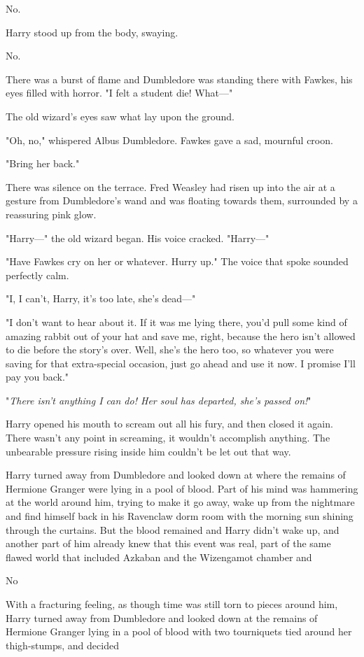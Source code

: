 No.

Harry stood up from the body, swaying.

No.

There was a burst of flame and Dumbledore was standing there with Fawkes, his 
eyes filled with horror. "I felt a student die! What---"

The old wizard's eyes saw what lay upon the ground.

"Oh, no," whispered Albus Dumbledore. Fawkes gave a sad, mournful croon.

"Bring her back."

There was silence on the terrace. Fred Weasley had risen up into the air at a 
gesture from Dumbledore's wand and was floating towards them, surrounded by a 
reassuring pink glow.

"Harry---" the old wizard began. His voice cracked. "Harry---"

"Have Fawkes cry on her or whatever. Hurry up." The voice that spoke sounded 
perfectly calm.

"I, I can't, Harry, it's too late, she's dead---"

"I don't want to hear about it. If it was me lying there, you'd pull some kind 
of amazing rabbit out of your hat and save me, right, because the hero isn't 
allowed to die before the story's over. Well, she's the hero too, so whatever 
you were saving for that extra-special occasion, just go ahead and use it now. 
I promise I'll pay you back."

"\emph{There isn't anything I can do! Her soul has departed, she's passed on!}"

Harry opened his mouth to scream out all his fury, and then closed it again. 
There wasn't any point in screaming, it wouldn't accomplish anything. The 
unbearable pressure rising inside him couldn't be let out that way.

Harry turned away from Dumbledore and looked down at where the remains of 
Hermione Granger were lying in a pool of blood. Part of his mind was hammering 
at the world around him, trying to make it go away, wake up from the nightmare 
and find himself back in his Ravenclaw dorm room with the morning sun shining 
through the curtains. But the blood remained and Harry didn't wake up, and 
another part of him already knew that this event was real, part of the same 
flawed world that included Azkaban and the Wizengamot chamber and

No

With a fracturing feeling, as though time was still torn to pieces around him, 
Harry turned away from Dumbledore and looked down at the remains of Hermione 
Granger lying in a pool of blood with two tourniquets tied around her 
thigh-stumps, and decided

